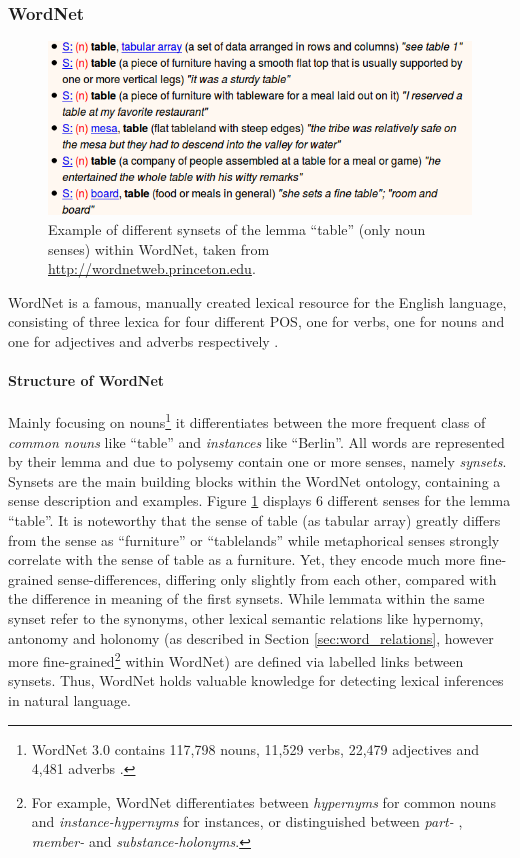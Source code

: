 \subsubsection{WordNet}\label{sec:wordnet}
\begin{figure}
\centering
	\includegraphics[totalheight=3.5cm]{fig/wordnet_example.png}
	\caption{Example of different synsets of the lemma ``table'' (only noun senses) within WordNet, taken from \href{http://wordnetweb.princeton.edu}{http://wordnetweb.princeton.edu}.}
	\label{fig:wordnet}
\end{figure}
WordNet \citep{miller1995wordnet} is a famous, manually created lexical resource for the English language, consisting of three lexica for four different \ac{POS}, one for verbs, one for nouns and one for adjectives and adverbs respectively \citep{Jurafsky2008May}. 
\paragraph*{Structure of WordNet} 
Mainly focusing on nouns\footnote{WordNet 3.0 contains 117,798 nouns, 11,529 verbs, 22,479 adjectives and 4,481 adverbs \citep{Jurafsky2008May}.} it differentiates between the more frequent class of \textit{common nouns} like ``table'' and \textit{instances} like ``Berlin''. All words are represented by their lemma and due to polysemy contain one or more senses, namely \textit{synsets}. Synsets are the main building blocks within the WordNet ontology, containing a sense description and examples. Figure \ref{fig:wordnet} displays 6 different senses for the lemma ``table''. It is noteworthy that the sense of table (as tabular array) greatly differs from the sense as ``furniture'' or ``tablelands'' while metaphorical senses strongly correlate with the sense of table as a furniture. Yet, they encode much more fine-grained sense-differences, differing only slightly from each other, compared with the difference in meaning of the first synsets. While lemmata within the same synset refer to the synonyms, other lexical semantic relations like hypernomy, antonomy and holonomy (as described in Section \ref{sec:word_relations}, however more fine-grained\footnote{For example,  WordNet differentiates between \textit{hypernyms} for common nouns and \textit{instance-hypernyms} for instances, or distinguished between \textit{part- }, \textit{member-} and \textit{substance-holonyms}.} within WordNet) are defined via labelled links between synsets. Thus, WordNet holds valuable knowledge for detecting lexical inferences in natural language.

